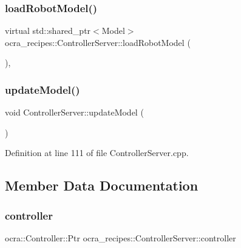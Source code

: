\subsubsection{\texorpdfstring{load\+Robot\+Model()}{loadRobotModel()}}
{\footnotesize\ttfamily virtual std\+::shared\+\_\+ptr$<$Model$>$ ocra\+\_\+recipes\+::\+Controller\+Server\+::load\+Robot\+Model (\begin{DoxyParamCaption}{ }\end{DoxyParamCaption})\hspace{0.3cm}{\ttfamily [protected]}, {}}

\hypertarget{classocra__recipes_1_1ControllerServer_a83755d02be88fa3805d770d964995fb0}{}\label{classocra__recipes_1_1ControllerServer_a83755d02be88fa3805d770d964995fb0} 
\subsubsection{\texorpdfstring{update\+Model()}{updateModel()}}
{\footnotesize\ttfamily void Controller\+Server\+::update\+Model (\begin{DoxyParamCaption}{ }\end{DoxyParamCaption})}



Definition at line 111 of file Controller\+Server.\+cpp.



\subsection{Member Data Documentation}
\hypertarget{classocra__recipes_1_1ControllerServer_a8e452bd0a8dce47b6fd289599e7ce210}{}\label{classocra__recipes_1_1ControllerServer_a8e452bd0a8dce47b6fd289599e7ce210} 
\subsubsection{\texorpdfstring{controller}{controller}}
{\footnotesize\ttfamily ocra\+::\+Controller\+::\+Ptr ocra\+\_\+recipes\+::\+Controller\+Server\+::controller\hspace{0.3cm}{\ttfamily [protected]}}



